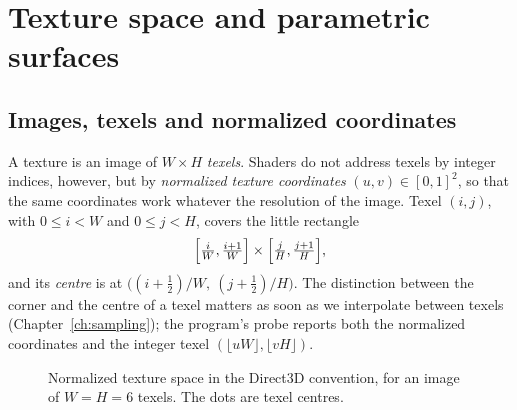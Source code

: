 \chapter{Texture space and parametric surfaces}
\label{ch:texspace}

\section{Images, texels and normalized coordinates}

A texture is an image of $W\times H$ \emph{texels}. Shaders do not address texels by
integer indices, however, but by \emph{normalized texture coordinates} $(u,v)\in[0,1]^2$,
so that the same coordinates work whatever the resolution of the image. Texel $(i,j)$, with
$0\le i<W$ and $0\le j<H$, covers the little rectangle
\[
  \Bigl[\tfrac{i}{W},\tfrac{i+1}{W}\Bigr]\times\Bigl[\tfrac{j}{H},\tfrac{j+1}{H}\Bigr],
\]
and its \emph{centre} is at $\bigl((i+\frac12)/W,\ (j+\frac12)/H\bigr)$. The distinction
between the corner and the centre of a texel matters as soon as we interpolate between texels
(Chapter~\ref{ch:sampling}); the program's probe reports both the normalized coordinates and
the integer texel $(\lfloor uW\rfloor,\lfloor vH\rfloor)$.

\begin{figure}[ht]
\centering
{}
\caption{Normalized texture space in the Direct3D convention, for an image of
$W=H=6$ texels. The dots are texel centres.}
\label{fig:uvspace}
\end{figure}

